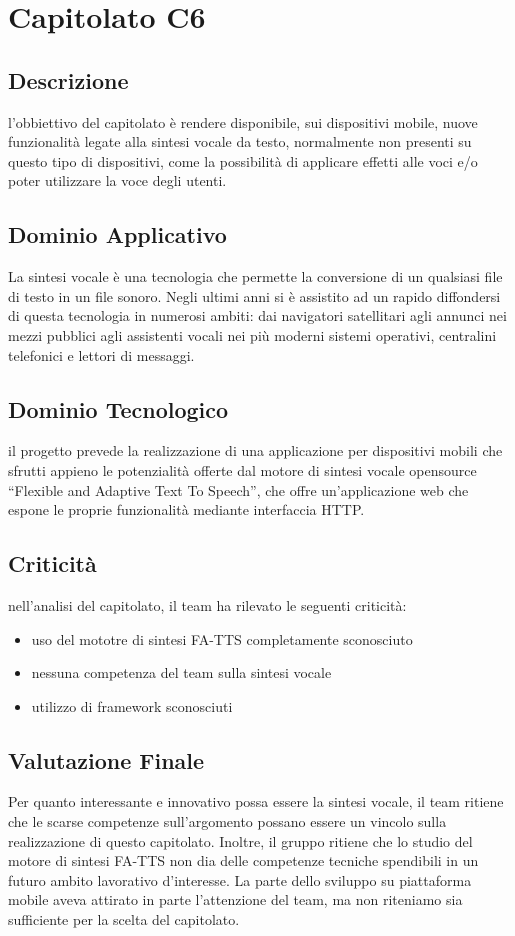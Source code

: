 \section{Capitolato C6}
\subsection{Descrizione}
l’obbiettivo del capitolato è rendere disponibile, sui dispositivi mobile, nuove funzionalità legate alla sintesi vocale da testo, normalmente non presenti su questo tipo di dispositivi, come la possibilità di  applicare effetti alle voci e/o poter utilizzare la voce degli utenti.

\subsection{Dominio Applicativo}
La sintesi vocale è una tecnologia che permette la conversione di un qualsiasi file di testo in un file sonoro. Negli ultimi anni si è assistito ad un rapido diffondersi di questa tecnologia in numerosi ambiti: dai navigatori satellitari agli annunci nei mezzi pubblici agli assistenti vocali nei più moderni sistemi operativi, centralini telefonici e lettori di messaggi.

\subsection{Dominio Tecnologico}
il progetto prevede la realizzazione di una applicazione per dispositivi mobili che sfrutti appieno le potenzialità offerte dal motore di sintesi vocale opensource “Flexible and Adaptive Text To Speech”, che offre un’applicazione web che espone le proprie funzionalità mediante interfaccia HTTP. 

\subsection{Criticità}
nell'analisi del capitolato, il team ha rilevato le seguenti criticità:
\begin{itemize}
\item uso del mototre di sintesi FA-TTS completamente sconosciuto
\item nessuna competenza del team sulla sintesi vocale
\item utilizzo di framework sconosciuti
\end{itemize}

\subsection{Valutazione Finale}
Per quanto interessante e innovativo possa essere la sintesi vocale, il team ritiene che le scarse competenze sull’argomento possano essere un vincolo sulla realizzazione di questo capitolato. Inoltre, il gruppo ritiene che lo studio del motore di sintesi FA-TTS non dia delle competenze tecniche spendibili in un futuro ambito lavorativo d’interesse.
La parte dello sviluppo su piattaforma mobile aveva attirato in parte l’attenzione del team, ma non riteniamo sia sufficiente per la scelta del capitolato.
